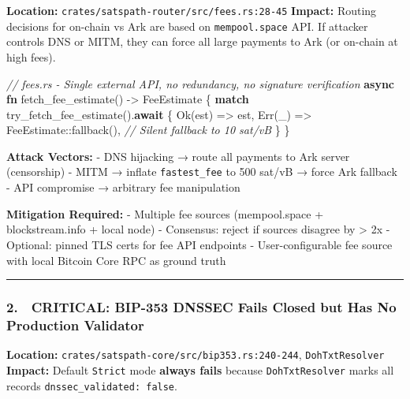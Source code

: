 \documentclass[
]{article}
\newenvironment{Shaded}{}{}
\newcommand{\CommentTok}[1]{\textcolor[rgb]{0.38,0.63,0.69}{\textit{#1}}}
\newcommand{\ConstantTok}[1]{\textcolor[rgb]{0.53,0.00,0.00}{#1}}
\newcommand{\ControlFlowTok}[1]{\textcolor[rgb]{0.00,0.44,0.13}{\textbf{#1}}}
\newcommand{\KeywordTok}[1]{\textcolor[rgb]{0.00,0.44,0.13}{\textbf{#1}}}
\newcommand{\NormalTok}[1]{#1}
\newcommand{\OperatorTok}[1]{\textcolor[rgb]{0.40,0.40,0.40}{#1}}
\newcommand{\PreprocessorTok}[1]{\textcolor[rgb]{0.74,0.48,0.00}{#1}}
\begin{document}
\textbf{Location:} \texttt{crates/satspath-router/src/fees.rs:28-45}
\textbf{Impact:} Routing decisions for on-chain vs Ark are based on
\texttt{mempool.space} API. If attacker controls DNS or MITM, they can
force all large payments to Ark (or on-chain at high fees).

\begin{Shaded}
\begin{Highlighting}[]
\CommentTok{// fees.rs {-} Single external API, no redundancy, no signature verification}
\KeywordTok{async} \KeywordTok{fn}\NormalTok{ fetch\_fee\_estimate() }\OperatorTok{{-}\textgreater{}}\NormalTok{ FeeEstimate }\OperatorTok{\{}
    \ControlFlowTok{match}\NormalTok{ try\_fetch\_fee\_estimate()}\OperatorTok{.}\KeywordTok{await} \OperatorTok{\{}
        \ConstantTok{Ok}\NormalTok{(est) }\OperatorTok{=\textgreater{}}\NormalTok{ est}\OperatorTok{,}
        \ConstantTok{Err}\NormalTok{(\_) }\OperatorTok{=\textgreater{}} \PreprocessorTok{FeeEstimate::}\NormalTok{fallback()}\OperatorTok{,}  \CommentTok{// Silent fallback to 10 sat/vB}
    \OperatorTok{\}}
\OperatorTok{\}}
\end{Highlighting}
\end{Shaded}

\textbf{Attack Vectors:} - DNS hijacking → route all payments to Ark
server (censorship) - MITM → inflate \texttt{fastest\_fee} to 500 sat/vB
→ force Ark fallback - API compromise → arbitrary fee manipulation

\textbf{Mitigation Required:} - Multiple fee sources (mempool.space +
blockstream.info + local node) - Consensus: reject if sources disagree
by \textgreater{} 2x - Optional: pinned TLS certs for fee API endpoints
- User-configurable fee source with local Bitcoin Core RPC as ground
truth

\begin{center}\rule{0.5\linewidth}{0.5pt}\end{center}

\hypertarget{critical-bip-353-dnssec-fails-closed-but-has-no-production-validator}{%
\subsubsection{2. 🔴 CRITICAL: BIP-353 DNSSEC Fails Closed but Has No
Production
Validator}\label{critical-bip-353-dnssec-fails-closed-but-has-no-production-validator}}

\textbf{Location:} \texttt{crates/satspath-core/src/bip353.rs:240-244},
\texttt{DohTxtResolver} \textbf{Impact:} Default \texttt{Strict} mode
\textbf{always fails} because \texttt{DohTxtResolver} marks all records
\texttt{dnssec\_validated:\ false}.
\end{document}

